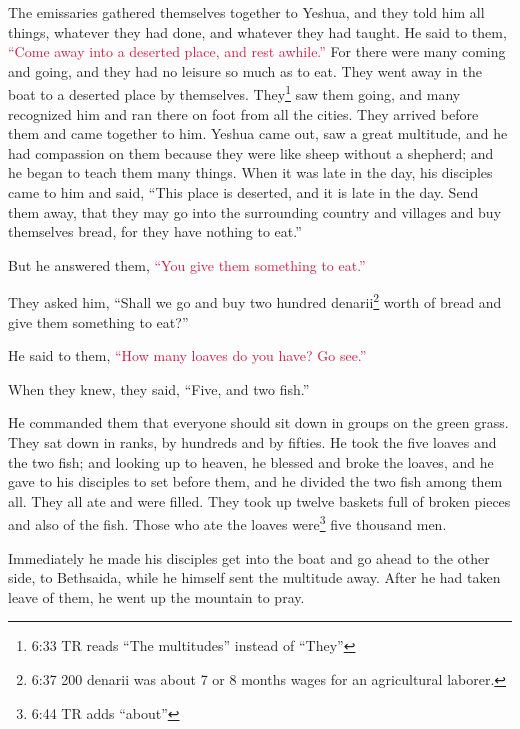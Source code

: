 \myverse{}The emissaries gathered themselves together to Yeshua, and they
told him all things, whatever they had done, and whatever they had taught.
\myverse{}He said to them,
\textcolor{crimson}{“Come away into a deserted place, and rest awhile.”} For there were many coming and going, and
they had no leisure so much as to eat.
\myverse{}They went away in the boat to a deserted place by themselves.
\myverse{}They\footnote{6:33 TR reads “The multitudes” instead of “They”} saw them going, and many recognized him
and ran there on foot from all the cities. They arrived before them and came together to him.
\myverse{}Yeshua came out, saw a great multitude, and he had compassion on them because
they were like sheep without a shepherd; and he began to teach them many things.
\myverse{}When it was late in the day, his disciples came to him and said, “This place
is deserted, and it is late in the day.
\myverse{}Send them away, that they may go into the surrounding country and villages
and buy themselves bread, for they have nothing to eat.”

\myverse{}But he answered them,
\textcolor{crimson}{“You give them something to eat.”}

They asked him, “Shall we go and buy two hundred denarii\footnote{6:37 200 denarii was about 7 or 8 months wages for an agricultural laborer.} worth of bread
and give them something to eat?”

\myverse{}He said to them,
\textcolor{crimson}{“How many loaves do you have? Go see.”}

When they knew, they said, “Five, and two fish.”

\myverse{}He commanded them that everyone should sit down in groups on
the green grass.
\myverse{}They sat down in ranks, by hundreds and by fifties.
\myverse{}He took the five loaves and the two fish; and looking up to heaven, he blessed
and broke the loaves, and he gave to his disciples to set before them, and he divided the two fish among
them all.
\myverse{}They all ate and were filled.
\myverse{}They took up twelve baskets full of broken pieces and also of the fish.
\myverse{}Those who ate the loaves were\footnote{6:44 TR adds “about”} five thousand men.

\myverse{}Immediately he made his disciples get into the boat and go ahead
to the other side, to Bethsaida, while he himself sent the multitude away.
\myverse{}After he had taken leave of them, he went up the mountain to pray.

